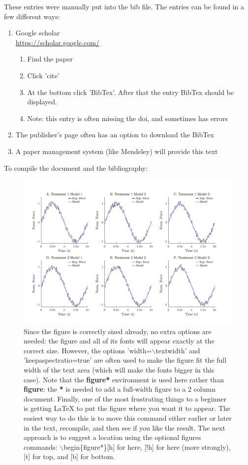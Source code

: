 \documentclass[11pt,twocolumn,a4paper]{article}
\begin{document}
These entries were manually put into the bib file. The entries can be found in a few different ways:
\begin{enumerate}
\item Google scholar\\ \url{https://scholar.google.com/}
\begin{enumerate}
    \item Find the paper
    \item Click 'cite'
    \item At the bottom click 'BibTex'. After that the entry BibTex should be displayed.
    \item Note: this entry is often missing the doi, and sometimes has errors
\end{enumerate}    
\item The publisher's page often has an option to download the BibTex 
\item A paper management system (like Mendeley) will provide this text
\end{enumerate}    

To compile the document and the bibliography:

\begin{figure}[t]
    \centering
    \includegraphics{figures/fig_exampleSingleColumnPlot.pdf}
    \caption{Since the figure is correctly sized already, no extra options are needed: the figure and all of its fonts will appear exactly at the correct size. However, the options 'width=$\backslash$textwidth' and 'keepaspectratio=true' are often used to make the figure fit the full width of the text area (which will make the fonts bigger in this case). Note that the \textbf{figure*} environment is used here rather than \textbf{figure}: the \textbf{*} is needed to add a full-width figure to a 2 column document. Finally, one of the most frustrating things to a beginner is getting \LaTeX{} to put the figure where you want it to appear. The easiest way to do this is to move this command either earlier or later in the text, recompile, and then see if you like the result. The next approach is to suggest a location using the optional figures commands: $\backslash$begin\{figure*\}[h] for here, [!h] for here (more strongly), [t] for top, and [b] for bottom.
    \label{fig:model}}
\end{figure}
\end{document}
